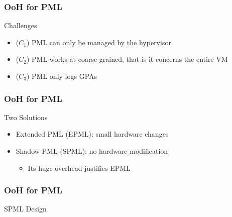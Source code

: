 \documentclass[xcolor=table,bigger,unknownkeysallowed]{beamer}
\begin{document}
        \begin{frame}
                \frametitle{OoH for PML}			
			\begin{block}{Challenges}
				\begin{itemize}
					\item ($C_1$) PML can only be managed by the hypervisor
					\item ($C_2$) PML works at coarse-grained, that is it concerns the entire VM
					\item ($C_3$) PML only logs GPAs
				\end{itemize}
			\end{block} 
        \end{frame}         
        \begin{frame}
            \frametitle{OoH for PML}			
			\begin{block}{Two Solutions}
				\begin{itemize}
					\item Extended PML (EPML): small hardware changes
					\item Shadow PML (SPML): no hardware modification					
					\begin{itemize}
						\item Its huge overhead justifies EPML
					\end{itemize}
				\end{itemize}
			\end{block} 
        \end{frame}  
        \begin{frame}
			\thispagestyle{empty}
			\frametitle{OoH for PML}			
			\begin{block}{SPML Design}
				\begin{figure}
				\centering
				\end{figure}
			\end{block}		
        \end{frame}
\end{document}
